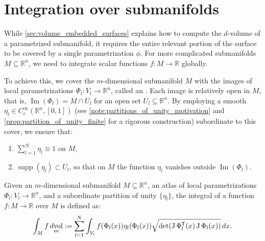 
\section{Integration over submanifolds}
\label{sec:integration_over_submanifolds}

While \cref{sec:volume_embedded_surfaces} explains how to compute the $d$-volume of a parametrized submanifold, it requires the entire relevant portion of the surface to be covered by a single parametrization $\phi$. For more complicated submanifolds $M \subseteq \mathbb{R}^n$, we need to integrate scalar functions $f : M \to \mathbb{R}$ globally. 

To achieve this, we cover the $m$-dimensional submanifold $M$ with the images of local parametrizations $\Phi_l : V_l \to \mathbb{R}^n$, called an . Each image is relatively open in $M$, that is, $\operatorname{Im}(\Phi_l) = M \cap U_l$ for an open set $U_l \subseteq \mathbb{R}^n$. By employing a smooth  $\eta_l \in C_c^\infty(\mathbb{R}^n, [0,1])$ (see \cref{note:partitions_of_unity_motivation} and \cref{prop:partition_of_unity_finite} for a rigorous construction) subordinate to this cover, we ensure that:
\begin{enumerate}[label=\textbf{(\alph*)}]
    \item $\sum_{l=1}^N \eta_l \equiv 1$ on $M$,
    \item $\operatorname{supp}(\eta_l) \subset U_l$, so that on $M$ the function $\eta_l$
      vanishes outside $\operatorname{Im}(\Phi_l)$.
\end{enumerate}

\begin{definition}
\label{def:integral_scalar_submanifold}
Given an $m$-dimensional submanifold $M \subseteq \mathbb{R}^n$, an atlas of local parametrizations $\Phi_l : V_l \to \mathbb{R}^n$, and a subordinate partition of unity $\{\eta_l\}$, the integral of a function $f : M \to \mathbb{R}$ over $M$ is defined as:
\[\int_M f \mathop{d\text{vol}}_m := \sum_{l=1}^N \int_{V_l} f(\Phi_l(x)) \eta_l(\Phi_l(x)) \sqrt{\det(\operatorname{J}\Phi_l^{\mathsf{T}}(x) \operatorname{J}\Phi_l(x))} \,dx.\]
\end{definition}

